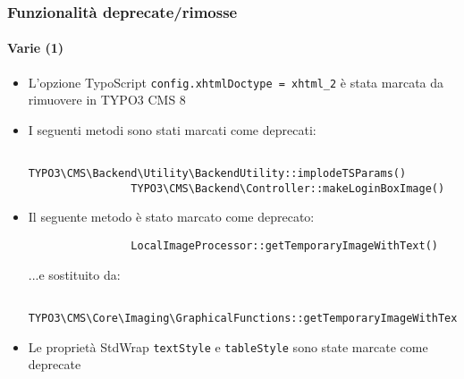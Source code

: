 \begin{frame}[fragile]
	\frametitle{Funzionalità deprecate/rimosse}
	\framesubtitle{Varie (1)}

	\begin{itemize}
		\item L'opzione TypoScript \texttt{config.xhtmlDoctype = xhtml\_2} è stata marcata da rimuovere in TYPO3 CMS 8

		\item I seguenti metodi sono stati marcati come deprecati:
			\begin{lstlisting}
				TYPO3\CMS\Backend\Utility\BackendUtility::implodeTSParams()
				TYPO3\CMS\Backend\Controller::makeLoginBoxImage()
			\end{lstlisting}

		\item Il seguente metodo è stato marcato come deprecato:
			\begin{lstlisting}
				LocalImageProcessor::getTemporaryImageWithText()
			\end{lstlisting}

			...e sostituito da:

			\begin{lstlisting}
				TYPO3\CMS\Core\Imaging\GraphicalFunctions::getTemporaryImageWithText()
			\end{lstlisting}

		\item Le proprietà StdWrap \texttt{textStyle} e \texttt{tableStyle} sono state marcate come deprecate

	\end{itemize}

\end{frame}


